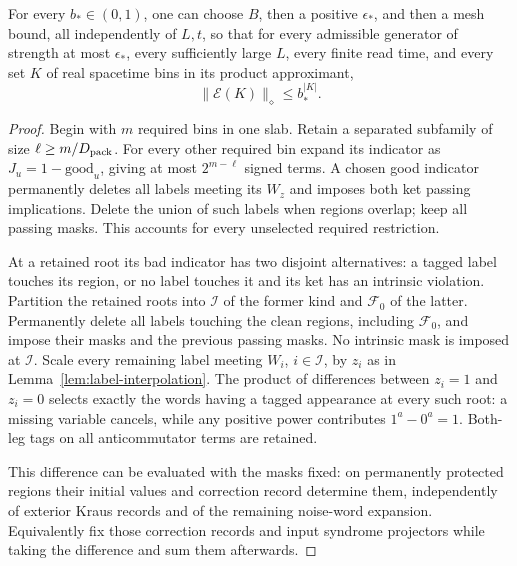 \begin{proposition}
\label{prop:coherent-joint}
For every \(b_*\in(0,1)\), one can choose \(B\), then a positive
\(\epsilon_*\), and then a mesh bound, all independently of
\(L,t\), so that for every admissible generator of strength
at most \(\epsilon_*\), every sufficiently large \(L\), every
finite read time, and every set \(K\) of real spacetime bins
in its product approximant,
\begin{equation}\label{eq:coherent-joint}
 \|\mathcal E(K)\|_\diamond\le b_*^{|K|}.
\end{equation}
\end{proposition}
\begin{proof}
Begin with \(m\) required bins in one slab. Retain a separated
subfamily of size \(\ell\ge m/D_{\rm pack}\).
For every other required bin expand its indicator as
\(J_u=1-\mathrm{good}_u\), giving at most \(2^{m-\ell}\)
signed terms. A chosen good indicator permanently deletes
all labels meeting its \(W_z\) and imposes both ket passing
implications. Delete the union of such labels when regions
overlap; keep all passing masks. This accounts for every
unselected required restriction.

At a retained root its bad indicator has two disjoint
alternatives: a tagged label touches its region, or no
label touches it and its ket has an intrinsic violation.
Partition the retained roots into \(\mathcal I\) of the
former kind and \(\mathcal F_0\) of the latter.
Permanently delete all labels touching the clean regions,
including \(\mathcal F_0\), and impose their masks and the
previous passing masks. No intrinsic mask is imposed at
\(\mathcal I\).
Scale every remaining label meeting \(W_i\), \(i\in\mathcal I\),
by \(z_i\) as in Lemma~\ref{lem:label-interpolation}.
The product of differences between \(z_i=1\) and \(z_i=0\)
selects exactly the words having a tagged appearance at every
such root: a missing variable cancels, while any positive
power contributes \(1^a-0^a=1\).
Both-leg tags on all anticommutator terms are retained.

This difference can be evaluated with the masks fixed:
on permanently protected regions their initial values and
correction record determine them, independently of exterior
Kraus records and of the remaining noise-word expansion.
Equivalently fix those correction records and input syndrome
projectors while taking the difference and sum them afterwards.


\end{proof}

